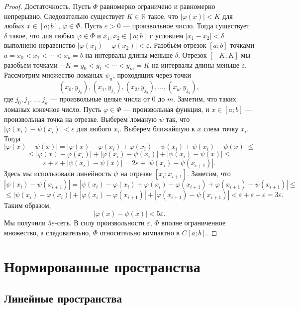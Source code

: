 \documentclass[12pt, titlepage, oneside]{amsbook}
\newcommand{\RR}{\mathbb{R}}
\theoremstyle{definition}
\theoremstyle{remark}
\begin{document}
\begin{proof}
	Достаточность. Пусть $\Phi$ равномерно ограничено и равномерно непрерывно. Следовательно существует $K\in \RR$ такое, что $|\varphi(x)|<K$ для любых $x\in[a;b]$, $\varphi\in\Phi$. Пусть $\varepsilon>0$ --- произвольное число. Тогда существует $\delta$ такое, что для любых $\varphi\in\Phi$ и $x_1,x_2\in[a;b]$ с условием $|x_1-x_2|<\delta$ выполнено неравенство $|\varphi(x_1)-\varphi(x_2)|<\varepsilon$. Разобьём отрезок $[a;b]$ точками $a=x_0<x_1<\cdots<x_k=b$ на интервалы длины меньше $\delta$. Отрезок $[-K;K]$ мы разобьем точками $-K=y_0<y_1<\cdots<y_m=K$ на интервалы длины меньше $\varepsilon$. Рассмотрим множество ломаных $\psi_n$, проходящих через точки $$(x_0,y_{j_0}),(x_1,y_{j_1}),(x_2,y_{j_2}),\ldots,(x_k,y_{j_k}),$$ где $j_0,j_1,\ldots, j_k$ --- произвольные целые числа от $0$ до $m$. Заметим, что таких ломаных конечное число. Пусть $\varphi\in\Phi$ --- произвольная функция, и $x\in[a;b]$ --- произвольная точка на отрезке. Выберем ломаную $\psi$ так, что $|\varphi(x_i)-\psi(x_i)|<\varepsilon$ для любого $x_i$. Выберем ближайшую к $x$ слева точку $x_i$. Тогда $$|\varphi(x)-\psi(x)|=|\varphi(x)-\varphi(x_i)+\varphi(x_i)-\psi(x_i)+\psi(x_i)-\psi(x)|\leq$$ $$\leq|\varphi(x)-\varphi(x_i)|+|\varphi(x_i)-\psi(x_i)|+|\psi(x_i)-\psi(x)|\leq$$ $$\varepsilon+\varepsilon+|\psi(x_i)-\psi(x)|=2\varepsilon+|\psi(x_i)-\psi(x_{i+1})|.$$ Здесь мы использовали линейность $\psi$ на отрезке $[x_i;x_{i+1}]$. Заметим, что $$|\psi(x_i)-\psi(x_{i+1})|=|\psi(x_i)-\varphi(x_i)+\varphi(x_i)-\varphi(x_{i+1})+\varphi(x_{i+1})-\psi(x_{i+1})|\leq$$ $$\leq|\psi(x_i)-\varphi(x_i)|+|\varphi(x_i)-\varphi(x_{i+1})|+|\varphi(x_{i+1})-\psi(x_{i+1})|<\varepsilon+\varepsilon+\varepsilon=3\varepsilon.$$ Таким образом, $$|\varphi(x)-\psi(x)|<5\varepsilon.$$ Мы получили $5\varepsilon$-сеть. В силу произвольности $\varepsilon$, $\Phi$ вполне ограниченное множество, а следовательно, $\Phi$ относительно компактно в $C[a;b]$.
\end{proof}


\chapter{Нормированные пространства}

\section{Линейные пространства}
\end{document}
